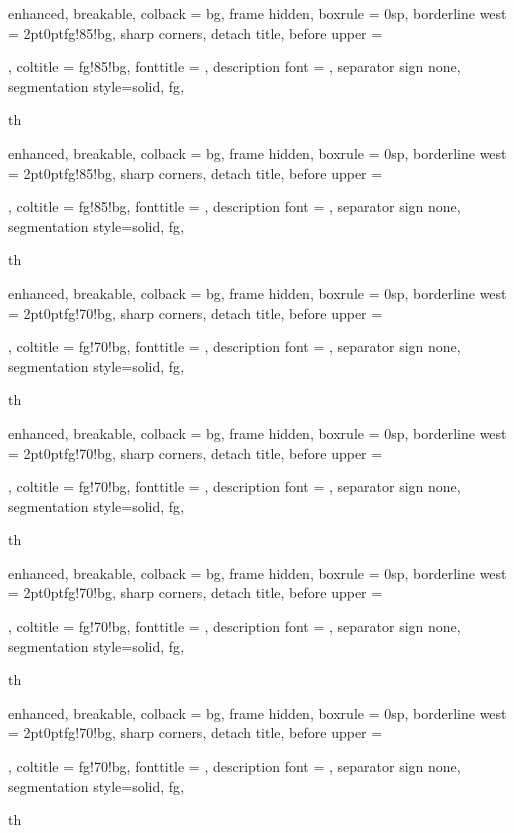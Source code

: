 {%
	enhanced,
	breakable,
	colback = bg,
	frame hidden,
	boxrule = 0sp,
	borderline west = {2pt}{0pt}{fg!85!bg},
	sharp corners,
	detach title,
	before upper = \tcbtitle\par\smallskip,
	coltitle = fg!85!bg,
	fonttitle = \sffamily,
	description font = \mdseries,
	separator sign none,
	segmentation style={solid, fg},
}
{th}
{%
	enhanced,
	breakable,
	colback = bg,
	frame hidden,
	boxrule = 0sp,
	borderline west = {2pt}{0pt}{fg!85!bg},
	sharp corners,
	detach title,
	before upper = \tcbtitle\par\smallskip,
	coltitle = fg!85!bg,
	fonttitle = \sffamily,
	description font = \mdseries,
	separator sign none,
	segmentation style={solid, fg},
}
{th}


{%
	enhanced,
	breakable,
	colback = bg,
	frame hidden,
	boxrule = 0sp,
	borderline west = {2pt}{0pt}{fg!70!bg},
	sharp corners,
	detach title,
	before upper = \tcbtitle\par\smallskip,
	coltitle = fg!70!bg,
	fonttitle = \sffamily,
	description font = \mdseries,
	separator sign none,
	segmentation style={solid, fg},
}
{th}
{%
	enhanced,
	breakable,
	colback = bg,
	frame hidden,
	boxrule = 0sp,
	borderline west = {2pt}{0pt}{fg!70!bg},
	sharp corners,
	detach title,
	before upper = \tcbtitle\par\smallskip,
	coltitle = fg!70!bg,
	fonttitle = \sffamily,
	description font = \mdseries,
	separator sign none,
	segmentation style={solid, fg},
}
{th}

{%
	enhanced,
	breakable,
	colback = bg,
	frame hidden,
	boxrule = 0sp,
	borderline west = {2pt}{0pt}{fg!70!bg},
	sharp corners,
	detach title,
	before upper = \tcbtitle\par\smallskip,
	coltitle = fg!70!bg,
	fonttitle = \sffamily,
	description font = \mdseries,
	separator sign none,
	segmentation style={solid, fg},
}
{th}
{%
	enhanced,
	breakable,
	colback = bg,
	frame hidden,
	boxrule = 0sp,
	borderline west = {2pt}{0pt}{fg!70!bg},
	sharp corners,
	detach title,
	before upper = \tcbtitle\par\smallskip,
	coltitle = fg!70!bg,
	fonttitle = \sffamily,
	description font = \mdseries,
	separator sign none,
	segmentation style={solid, fg},
}
{th}

